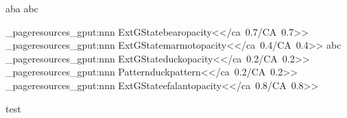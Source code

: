 \documentclass{article}
\begin{document}
aba \newpage abc\newpage

\ExplSyntaxOn



\pdf_pageresources_gput:nnn {ExtGState}{bearopacity}{<</ca~0.7/CA~0.7>>}
\pdf_pageresources_gput:nnn {ExtGState}{marmotopacity}{<</ca~0.4/CA~0.4>>}
abc
\newpage
\pdf_pageresources_gput:nnn {ExtGState}{duckopacity}{<</ca~0.2/CA~0.2>>}
\pdf_pageresources_gput:nnn {Pattern}{duckpattern}{<</ca~0.2/CA~0.2>>}
\pdf_pageresources_gput:nnn {ExtGState}{efalantopacity}{<</ca~0.8/CA~0.8>>}

test%
\ExplSyntaxOff
\end{document}
